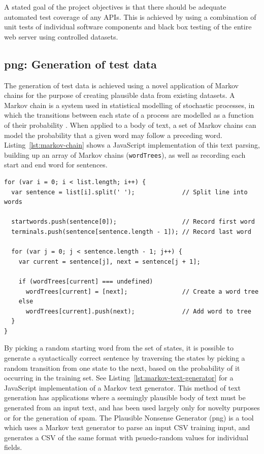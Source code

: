A stated goal of the project objectives is that there should be
adequate automated test coverage of any APIs. This is achieved by
using a combination of unit tests of individual software components
and black box testing of the entire web server using controlled
datasets.

\subsection{png: Generation of test data}\label{subsec:png}

The generation of test data is achieved using a novel application of
Markov chains for the purpose of creating plausible data from existing
datasets. A Markov chain is a system used in statistical modelling of
stochastic processes, in which the transitions between each state of a
process are modelled as a function of their probability
\cite{atwood2008markov}. When applied to a body of text, a set of
Markov chains can model the probability that a given word may follow a
preceding word. Listing~\ref{lst:markov-chain} shows a JavaScript
implementation of this text parsing, building up an array of Markov
chains (\texttt{wordTrees}), as well as recording each start and end
word for sentences.

\br{}


\lstset{language=JavaScript}
\begin{lstlisting}[label=lst:markov-chain,caption={%
      [Markov chain implementation]
      Markov chain implementation in JavaScript.}]
for (var i = 0; i < list.length; i++) {
  var sentence = list[i].split(' ');             // Split line into words

  startwords.push(sentence[0]);                  // Record first word
  terminals.push(sentence[sentence.length - 1]); // Record last word

  for (var j = 0; j < sentence.length - 1; j++) {
    var current = sentence[j], next = sentence[j + 1];

    if (wordTrees[current] === undefined)
      wordTrees[current] = [next];               // Create a word tree
    else
      wordTrees[current].push(next);             // Add word to tree
  }
}
\end{lstlisting}


By picking a random starting word from the set of states, it is
possible to generate a syntactically correct sentence by traversing
the states by picking a random transition from one state to the next,
based on the probability of it occurring in the training set. See
Listing~\ref{lst:markov-text-generator} for a JavaScript
implementation of a Markov text generator. This method of text
generation has applications where a seemingly plausible body of text
must be generated from an input text, and has been used largely only
for novelty purposes or for the generation of spam. The Plausible
Nonsense Generator (png) is a tool which uses a Markov text generator
to parse an input CSV training input, and generates a CSV of the same
format with psuedo-random values for individual fields.

